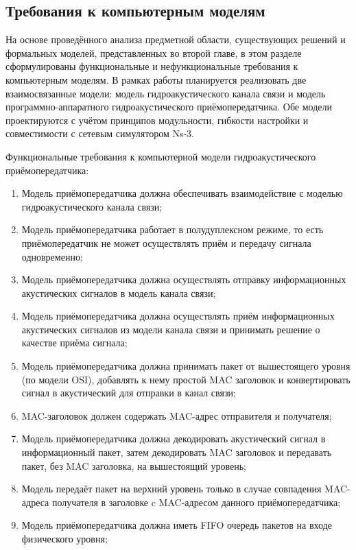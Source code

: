 \documentclass[
    numbers=section,
    document-code={ВКРБ--09.03.04--10.19--XX--26--81}
]{../latex/fqw}
\begin{document}
    \subsection{Требования к компьютерным моделям}
    \label{subsec:requirements_for_models}

    На основе проведённого анализа предметной области, существующих решений и формальных моделей,
    представленных во второй главе,
    в этом разделе сформулированы функциональные и нефункциональные требования к компьютерным моделям.
    В рамках работы планируется реализовать две взаимосвязанные модели:
    модель гидроакустического канала связи и модель программно-аппаратного гидроакустического приёмопередатчика.
    Обе модели проектируются с учётом принципов
    модульности,
    гибкости настройки и
    совместимости с сетевым симулятором Ns-3.

    Функциональные требования к компьютерной модели гидроакустического приёмопередатчика:

    \begin{enumerate}
        \def\labelenumi{\arabic{enumi}.}
        \item Модель приёмопередатчика должна обеспечивать взаимодействие с моделью гидроакустического канала связи;
        \item
        Модель приёмопередатчика работает в полудуплексном режиме,
        то есть приёмопередатчик не может осуществлять приём и передачу сигнала одновременно;
        \item
        Модель приёмопередатчика должна
        осуществлять отправку информационных акустических сигналов в модель канала связи;
        \item
        Модель приёмопередатчика должна
        осуществлять приём информационных акустических сигналов из модели канала связи и
        принимать решение о качестве приёма сигнала;
        \item
        Модель приёмопередатчика должна
        принимать пакет от вышестоящего уровня (по модели OSI),
        добавлять к нему простой MAC заголовок и
        конвертировать сигнал в акустический для отправки в канал связи;
        \item MAC-заголовок должен содержать MAC-адрес отправителя и получателя;
        \item
        Модель приёмопередатчика должна
        декодировать акустический сигнал в информационный пакет, затем
        декодировать MAC заголовок и передавать пакет, без MAC заголовка, на вышестоящий уровень;
        \item
        Модель передаёт пакет на верхний уровень только в случае совпадения
        MAC-адреса получателя в заголовке c MAC-адресом данного приёмопередатчика;
        \item Модель приёмопередатчика должна иметь FIFO очередь пакетов на входе физического уровня;
    \end{enumerate}
\end{document}
